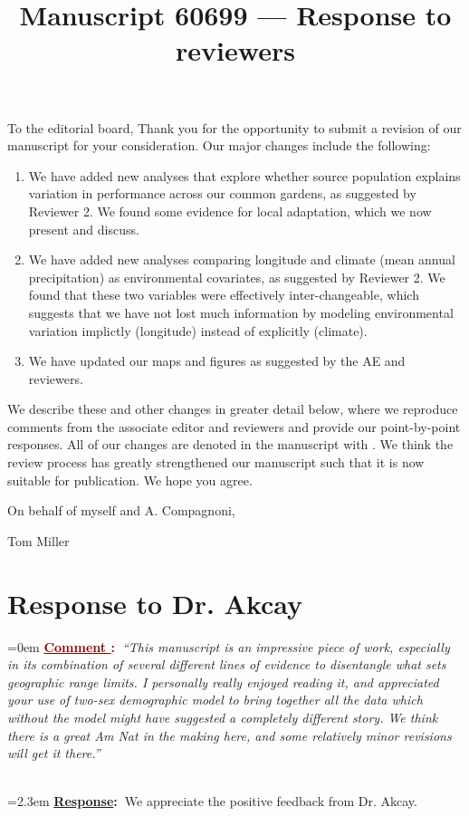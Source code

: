\documentclass[12pt]{article}
\newcounter{cN}
\newcommand{\comment}[1]{
	\vspace{2em}
	\refstepcounter{cN} %
	\noindent \hangindent=0em \textbf{\textcolor{Maroon}{\uline{Comment \thecN}:~}}\emph{``#1''}
	}
\newcommand{\response}[1]{
	\\[0.25em]
	\hangindent=2.3em \textbf{\textcolor{NavyBlue}{\uline{Response}:~}}#1
	}
\newcommand{\revise}[1]{{\color{Mahogany}{#1}}}
\begin{document}
\title{Manuscript 60699 --- Response to reviewers}

\maketitle
\noindent To the editorial board,
Thank you for the opportunity to submit a revision of our manuscript for your consideration. Our major changes include the following:
\begin{enumerate}
	\item We have added new analyses that explore whether source population explains variation in performance across our common gardens, as suggested by Reviewer 2. We found some evidence for local adaptation, which we now present and discuss. 
	\item We have added new analyses comparing longitude and climate (mean annual precipitation) as environmental covariates, as suggested by Reviewer 2. We found that these two variables were effectively inter-changeable, which suggests that we have not lost much information by modeling environmental variation implictly (longitude) instead of explicitly (climate).
	\item We have updated our maps and figures as suggested by the AE and reviewers.
\end{enumerate}


We describe these and other changes in greater detail below, where we reproduce comments from the associate editor and reviewers and provide our point-by-point responses. 
All of our changes are denoted in the manuscript with \revise{Mahogany font}.
We think the review process has greatly strengthened our manuscript such that it is now suitable for publication.
We hope you agree. 

\vspace{2em}
\hfill On behalf of myself and A. Compagnoni,

\hfill Tom Miller
\newpage

\section{Response to Dr. Akcay}
\vspace{-2em}

\comment{This manuscript is an impressive piece of work, especially in its combination of several different lines of evidence to disentangle what sets geographic range limits. I personally really enjoyed reading it, and appreciated your use of two-sex demographic model to bring together all the data which without the model might have suggested a completely different story. We think there is a great Am Nat in the making here, and some relatively minor revisions will get it there.}
\response{We appreciate the positive feedback from Dr. Akcay.}
\end{document}
